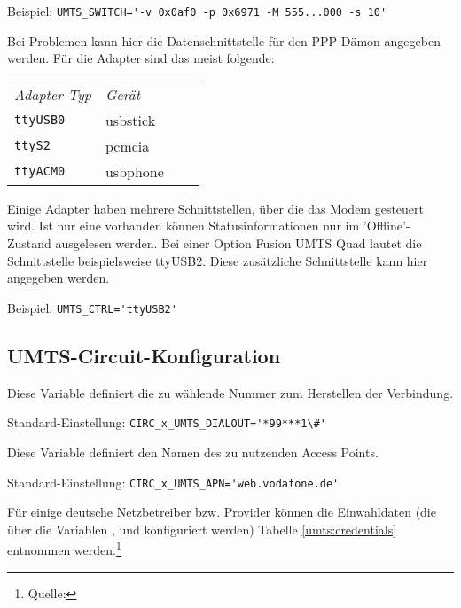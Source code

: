 \begin{description}
Beispiel: \verb+UMTS_SWITCH='-v 0x0af0 -p 0x6971 -M 555...000 -s 10'+


Bei Problemen kann hier die Datenschnittstelle für den PPP-Dämon angegeben
werden. Für die Adapter sind das meist folgende:

\begin{tabular}{llll}
\emph{Adapter-Typ}  &\emph{Gerät} \\
\verb+ttyUSB0+      &usbstick \\
\verb+ttyS2+        &pcmcia \\
\verb+ttyACM0+      &usbphone \\
\end{tabular}


Einige Adapter haben mehrere Schnittstellen, über die das Modem gesteuert wird.
Ist nur eine vorhanden können Statusinformationen nur im 'Offline'-Zustand
ausgelesen werden. Bei einer Option Fusion UMTS Quad lautet die Schnittstelle
beispielsweise ttyUSB2. Diese zusätzliche Schnittstelle kann hier angegeben
werden.

Beispiel: \verb+UMTS_CTRL='ttyUSB2'+

\end{description}

\subsection{UMTS-Circuit-Konfiguration}

\begin{description}


Diese Variable definiert die zu wählende Nummer zum Herstellen der Verbindung.

Standard-Einstellung: \verb+CIRC_x_UMTS_DIALOUT='*99***1\#'+


Diese Variable definiert den Namen des zu nutzenden Access Points.

Standard-Einstellung: \verb+CIRC_x_UMTS_APN='web.vodafone.de'+

\end{description}

Für einige deutsche Netzbetreiber bzw. Provider können die Einwahldaten
(die über die Variablen , 
und  konfiguriert werden) Tabelle
\ref{umts:credentials} entnommen werden.\footnote{Quelle:
}


